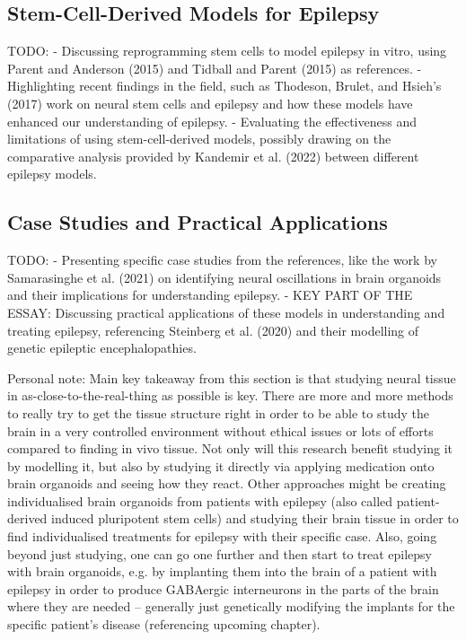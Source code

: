 \documentclass[10pt]{article}
\begin{document}
\begin{sloppypar}
  \subsection{Stem-Cell-Derived Models for Epilepsy}
  \label{sec:stem-cell-derived-models-for-epilepsy}

  TODO:
  - Discussing reprogramming stem cells to model epilepsy in vitro, using Parent and Anderson (2015) and Tidball and Parent (2015) as references.
  - Highlighting recent findings in the field, such as Thodeson, Brulet, and Hsieh's (2017) work on neural stem cells and epilepsy and how these models have enhanced our understanding of epilepsy.
  - Evaluating the effectiveness and limitations of using stem-cell-derived models, possibly drawing on the comparative analysis provided by Kandemir et al. (2022) between different epilepsy models.

  \subsection{Case Studies and Practical Applications}
  \label{sec:case-studies-and-practical-applications}

  TODO:
  - Presenting specific case studies from the references, like the work by Samarasinghe et al. (2021) on identifying neural oscillations in brain organoids and their implications for understanding epilepsy.
  - KEY PART OF THE ESSAY: Discussing practical applications of these models in understanding and treating epilepsy, referencing Steinberg et al. (2020) and their modelling of genetic epileptic encephalopathies.

  Personal note: Main key takeaway from this section is that studying neural tissue in as-close-to-the-real-thing as possible is key. There are more and more methods to really try to get the tissue structure right in order to be able to study the brain in a very controlled environment without ethical issues or lots of efforts compared to finding in vivo tissue. Not only will this research benefit studying it by modelling it, but also by studying it directly via applying medication onto brain organoids and seeing how they react. Other approaches might be creating individualised brain organoids from patients with epilepsy (also called patient-derived induced pluripotent stem cells) and studying their brain tissue in order to find individualised treatments for epilepsy with their specific case. Also, going beyond just studying, one can go one further and then start to treat epilepsy with brain organoids, e.g. by implanting them into the brain of a patient with epilepsy in order to produce GABAergic interneurons in the parts of the brain where they are needed – generally just genetically modifying the implants for the specific patient's disease (referencing upcoming chapter).


\end{sloppypar}
\end{document}

